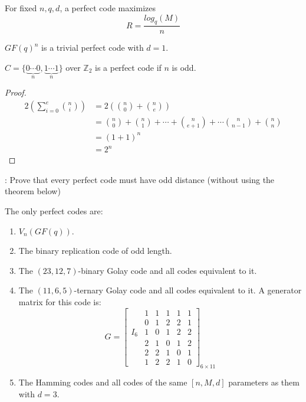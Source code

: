 For fixed $ n,q,d $, a perfect code maximizes
\[ R=\frac{log_q(M)}{n} \]
\begin{exbox}
    \begin{example}
        $ GF(q)^n $ is a trivial perfect code with $ d=1 $.

        $ C=\{\underbrace{0\cdots 0}_{n},\underbrace{1\cdots 1}_{n}\} $ over $ \mathbb{Z}_2 $
        is a perfect code if $ n $ is odd.
    \end{example}
\end{exbox}

\begin{proof}
    \begin{align*}
        2\left( \sum\limits_{i=0}^{e} \binom{n}{i} \right)
         & =2\left( \binom{n}{0}+\binom{n}{e} \right)                                         \\
         & =\binom{n}{0}+\binom{n}{1}+\cdots+\binom{n}{e+1}+\cdots\binom{n}{n-1}+\binom{n}{n} \\
         & =(1+1)^n                                                                           \\
         & =2^n
    \end{align*}
\end{proof}

: Prove that every perfect code must have odd distance
(without using the theorem below)

\begin{thmbox}
    \begin{theorem}[Tietäväinen, 1973]
        The only perfect codes are:
        \begin{enumerate}[(1)]
            \item $ V_n(GF(q)) $.
            \item The binary replication code of odd length.
            \item The $ (23,12,7) $-binary Golay code and all codes equivalent to it.
            \item The $ (11,6,5) $-ternary Golay code and all codes equivalent to it.
                  A generator matrix for this code is:
                  \[ G=
                      \left[\begin{array}{c|ccccc}
                                  & 1 & 1 & 1 & 1 & 1 \\
                                  & 0 & 1 & 2 & 2 & 1 \\
                              I_6 & 1 & 0 & 1 & 2 & 2 \\
                                  & 2 & 1 & 0 & 1 & 2 \\
                                  & 2 & 2 & 1 & 0 & 1 \\
                                  & 1 & 2 & 2 & 1 & 0
                          \end{array}\right]_{6\times 11} \]
            \item The Hamming codes and all codes of the same $ [n,M,d] $ parameters as them
                  with $ d=3 $.
        \end{enumerate}
    \end{theorem}
\end{thmbox}


